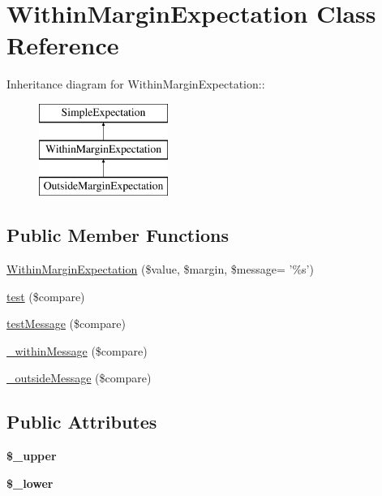 \hypertarget{class_within_margin_expectation}{
\section{WithinMarginExpectation Class Reference}
\label{class_within_margin_expectation}
}
Inheritance diagram for WithinMarginExpectation::\begin{figure}[H]
\begin{center}
\leavevmode
\includegraphics[height=3cm]{class_within_margin_expectation}
\end{center}
\end{figure}
\subsection*{Public Member Functions}
\begin{DoxyCompactItemize}
\item 
\hyperlink{class_within_margin_expectation_a6bd172519fd6aaa9eba71f96d1f48621}{WithinMarginExpectation} (\$value, \$margin, \$message= '\%s')
\item 
\hyperlink{class_within_margin_expectation_a3c8697495cb187b62bc6cf020e2e2ded}{test} (\$compare)
\item 
\hyperlink{class_within_margin_expectation_a4b2f6fda3d30a50c3b3ce003520262c8}{testMessage} (\$compare)
\item 
\hyperlink{class_within_margin_expectation_a1dc05788944d32ed735f353745f1270f}{\_\-withinMessage} (\$compare)
\item 
\hyperlink{class_within_margin_expectation_a39d1443aebe1ba7e22c14ec580a6dc1b}{\_\-outsideMessage} (\$compare)
\end{DoxyCompactItemize}
\subsection*{Public Attributes}
\begin{DoxyCompactItemize}
\item 
\hypertarget{class_within_margin_expectation_a84856f447bb18e4b0694684e3dfcbb31}{
{\bfseries \$\_\-upper}}
\label{class_within_margin_expectation_a84856f447bb18e4b0694684e3dfcbb31}

\item 
\hypertarget{class_within_margin_expectation_a8efd149036edaf545d6e8c4744dd1b34}{
{\bfseries \$\_\-lower}}
\label{class_within_margin_expectation_a8efd149036edaf545d6e8c4744dd1b34}

\end{DoxyCompactItemize}


